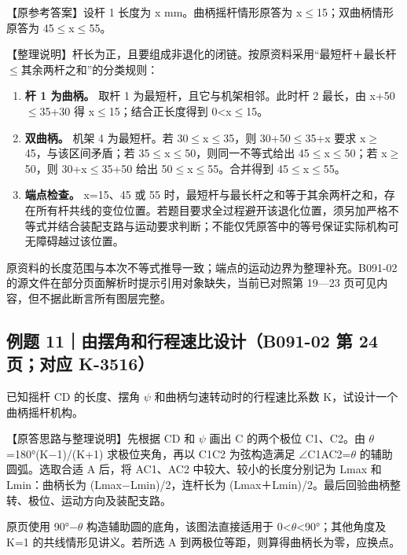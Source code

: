 \documentclass[zihao=5,a4paper,UTF8,fontset=fandol]{ctexart}
\begin{document}
【原参考答案】设杆 1 长度为 x mm。曲柄摇杆情形原答为 x$\le$15；双曲柄情形原答为 45$\le$x$\le$55。


【整理说明】杆长为正，且要组成非退化的闭链。按原资料采用“最短杆＋最长杆$\le$其余两杆之和”的分类规则：


\begin{enumerate}
\item 
\textbf{杆 1 为曲柄。} 取杆 1 为最短杆，且它与机架相邻。此时杆 2 最长，由 x+50$\le$35+30 得 x$\le$15；结合正长度得到 0<x$\le$15。


\item 
\textbf{双曲柄。} 机架 4 为最短杆。若 30$\le$x$\le$35，则 30+50$\le$35+x 要求 x$\ge$45，与该区间矛盾；若 35$\le$x$\le$50，则同一不等式给出 45$\le$x$\le$50；若 x$\ge$50，则 30+x$\le$35+50 给出 50$\le$x$\le$55。合并得到 45$\le$x$\le$55。


\item 
\textbf{端点检查。} x=15、45 或 55 时，最短杆与最长杆之和等于其余两杆之和，存在所有杆共线的变位位置。若题目要求全过程避开该退化位置，须另加严格不等式并结合装配支路与运动要求判断；不能仅凭原答中的等号保证实际机构可无障碍越过该位置。



\end{enumerate}

原资料的长度范围与本次不等式推导一致；端点的运动边界为整理补充。B091-02 的源文件在部分页面解析时提示引用对象缺失，当前已对照第 19—23 页可见内容，但不据此断言所有图层完整。


\subsection{例题 11｜由摆角和行程速比设计（B091-02 第 24 页；对应 K-3516）}

已知摇杆 CD 的长度、摆角 $\psi$ 和曲柄匀速转动时的行程速比系数 K，试设计一个曲柄摇杆机构。


【原答思路与整理说明】先根据 CD 和 $\psi$ 画出 C 的两个极位 C1、C2。由 $\theta$=180°(K$-$1)/(K+1) 求极位夹角，再以 C1C2 为弦构造满足 $\angle$C1AC2=$\theta$ 的辅助圆弧。选取合适 A 后，将 AC1、AC2 中较大、较小的长度分别记为 Lmax 和 Lmin：曲柄长为 (Lmax$-$Lmin)/2，连杆长为 (Lmax＋Lmin)/2。最后回验曲柄整转、极位、运动方向及装配支路。


原页使用 90°$-$$\theta$ 构造辅助圆的底角，该图法直接适用于 0<$\theta$<90°；其他角度及 K=1 的共线情形见讲义。若所选 A 到两极位等距，则算得曲柄长为零，应换点。


\Needspace{9cm}
\end{document}
